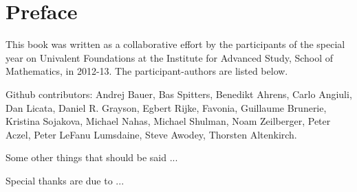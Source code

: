 \chapter*{Preface}
\label{cha:preface}


{%


%

This book was written as a collaborative effort by the participants of the special year on Univalent Foundations at the  Institute for Advanced Study, School of Mathematics, in 2012-13.  The participant-authors are listed below.


Github contributors:
Andrej Bauer,
Bas Spitters,
Benedikt Ahrens,
Carlo Angiuli,
Dan Licata,
Daniel R. Grayson,
Egbert Rijke,
Favonia,
Guillaume Brunerie,
Kristina Sojakova,
Michael Nahas,
Michael Shulman,
Noam Zeilberger,
Peter Aczel,
Peter LeFanu Lumsdaine,
Steve Awodey,
Thorsten Altenkirch.


Some other things that should be said ...

Special thanks are due to ...

\bigskip



}%

